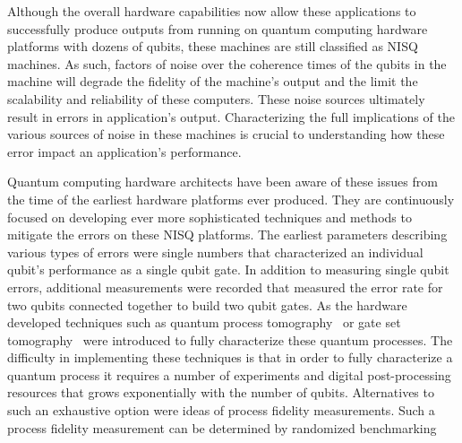 Although the overall hardware capabilities now allow these applications to successfully produce outputs from running on quantum computing hardware platforms with dozens of qubits, these machines are still classified as NISQ machines.  As such, factors of noise over the coherence times of the qubits in the machine will degrade the fidelity of the machine’s output and the limit the scalability and reliability of these computers.  These noise sources ultimately result in errors in application’s output.  Characterizing the full implications of the various sources of noise in these machines is crucial to understanding how these error impact an application’s performance.

Quantum computing hardware architects have been aware of these issues from the time of the earliest hardware platforms ever produced.  They are continuously focused on developing ever more sophisticated techniques and methods to mitigate the errors on these NISQ platforms.  The earliest parameters describing various types of errors were single numbers that characterized an individual qubit’s performance as a single qubit gate.  In addition to measuring single qubit errors, additional measurements were recorded that measured the error rate for two qubits connected together to build two qubit gates.  As the hardware developed techniques such as 
quantum process tomography~\cite{ref:Chuang1997} or gate set tomography~\cite{ref:Merkel2012,ref:Blume-Kohout2013,ref:Blume-Kohout2017} were introduced to fully characterize these quantum processes.  The difficulty in implementing these techniques is that in order to fully characterize a quantum process it requires a number of experiments and digital post-processing resources that grows exponentially with the number of qubits.  Alternatives to such an exhaustive option were ideas of process fidelity measurements.  Such a process fidelity measurement can be determined by randomized benchmarking ~\cite{ref:Emerson2005,ref:Dankert2009,ref:Magesan2011} 
